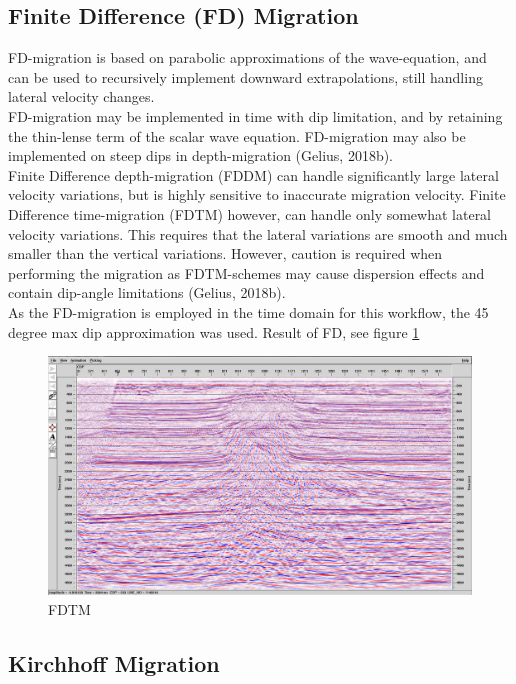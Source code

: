\documentclass[10pt,a4paper]{article}
\begin{document}
\subsection{Finite Difference (FD) Migration}

\noindent FD-migration is based on parabolic approximations of the wave-equation, and can be used to recursively implement downward extrapolations, still handling lateral velocity changes.\\
FD-migration may be implemented in time with dip limitation, and by retaining the thin-lense term of the scalar wave equation. FD-migration may also be implemented on steep dips in depth-migration (Gelius, 2018b).
\\
Finite Difference depth-migration (FDDM) can handle significantly large lateral velocity variations, but is highly sensitive to inaccurate migration velocity. Finite Difference time-migration (FDTM) however, can handle only somewhat lateral velocity variations. This requires that the lateral variations are smooth and much smaller than the vertical variations. However, caution is required when performing the migration as FDTM-schemes may cause dispersion effects and contain dip-angle limitations (Gelius, 2018b). 
\\
As the FD-migration is employed in the time domain for this workflow, the 45 degree max dip approximation was used. Result of FD, see figure \ref{FDTM}

\begin{figure}[H]
\includegraphics[width=\textwidth]{FDmed3aforkirchh.jpg}
\caption{FDTM}
\label{FDTM}
\end{figure}

\subsection{Kirchhoff Migration}
\end{document}
